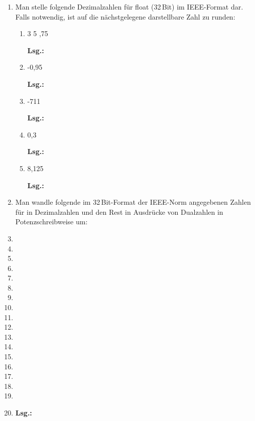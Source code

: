\documentclass[12pt,a4paper]{scrreprt}
\newcommand{\Lsg}{\par \textbf{Lsg.: }}
\newcommand{\Bit}{\,Bit}
\begin{document}
\begin{enumerate}
\begin{enumerate}
\Lsg%

\item -33 + 64

\Lsg%

\item 33 - 64

\Lsg%

\end{enumerate}

\item Man stelle folgende Dezimalzahlen für float (\si{32}{\Bit}) im IEEE-Format dar. Falls notwendig, ist auf die nächstgelegene darstellbare Zahl zu runden:

\begin{enumerate}
\item 3 5 ,75

\Lsg%

\item -0,95

\Lsg%

\item -711

\Lsg%

\item 0,3

\Lsg%

\item 8,125

\Lsg%

\end{enumerate}

\item Man wandle folgende im \si{32}{\Bit}-Format der IEEE-Norm angegebenen Zahlen für in Dezimalzahlen und den Rest in Ausdrücke von Dualzahlen in Potenzschreibweise um:

\item 
\item 
\item 
\item 
\item 
\item 
\item 
\item 
\item 
\item 
\item 
\item 
\item 
\item 
\item 
\item 
\item 
\item 

\Lsg%

\end{enumerate}
\end{document}
